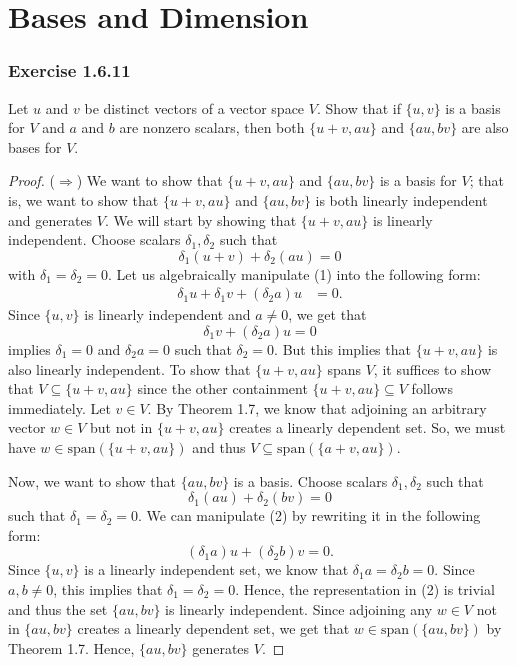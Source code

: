 \section{Bases and Dimension}

\subsubsection{Exercise 1.6.11} Let \( u  \) and \( v \) be distinct vectors of a vector space \( V  \). Show that if \( \{ u,v \}  \) is a basis for \( V  \) and \( a \) and \( b \) are nonzero scalars, then both \( \{ u + v , au  \}  \) and \( \{ au, bv \}  \) are also bases for \( V  \).

\begin{proof}
    (\( \Rightarrow \)) We want to show that \( \{ u+v , au \}  \) and \( \{ au, bv  \}  \) is a basis for \( V  \); that is, we want to show that \( \{ u +v , au  \}   \)  and \( \{ au, bv  \}  \) is both linearly independent and generates \( V  \). We will start by showing that \( \{ u+v , au \}  \) is linearly independent. Choose scalars \( \delta_{1}, \delta_{2}  \) such that 
    \[  \delta_{1} (u+v) + \delta_{2} (au) = 0 \tag{1}  \]
    with \( \delta_{1} =  \delta_{2} = 0  \). Let us algebraically manipulate (1) into the following form:
    \begin{align*} 
    \delta_{1} u + \delta_{1} v  + (\delta_{2}a) u &= 0.  
\end{align*}
Since \( \{ u,v  \}   \) is linearly independent and \( a \neq 0  \), we get that 
\[  \delta_{1} v + (\delta_{2}a) u = 0   \]
implies \( \delta_{1} = 0  \) and \( \delta_{2}a = 0  \) such that \( \delta_{2} = 0  \). But this implies that \( \{ u+v, au \}  \) is also linearly independent. To show that \( \{ u+v , au \}  \) spans \( V  \), it suffices to show that \( V \subseteq \{ u+v , au \}  \) since the other containment \( \{ u+ v , au  \} \subseteq V  \) follows immediately. Let \( v \in V  \). By Theorem 1.7, we know that adjoining an arbitrary vector \( w \in V  \) but not in \( \{ u+v , au \}  \) creates a linearly dependent set. So, we must have \( w \in \text{span}(\{ u+v , au \} ) \) and thus \( V \subseteq \text{span}(\{ a+v , au \} ) \). 

Now, we want to show that \( \{ au, bv  \}  \) is a basis. Choose scalars \( \delta_{1}, \delta_{2}  \) such that 
\[  \delta_{1} (au) + \delta_{2} (bv) = 0 \tag{2}   \]  
such that \( \delta_{1} = \delta_{2} = 0  \). We can manipulate (2) by rewriting it in the following form: 
\[  (\delta_{1}a) u + (\delta_{2}b) v = 0. \tag{3}  \]
Since \( \{ u,v  \}   \) is a linearly independent set, we know that   \( \delta_{1}a = \delta_{2}b = 0  \). Since \( a,b \neq 0 \), this implies that \( \delta_{1} = \delta_{2} = 0 \). Hence, the representation in (2) is trivial and thus the set \( \{ au, bv  \}  \) is linearly independent. Since adjoining any \( w \in V  \) not in \( \{ au, bv  \}  \) creates a linearly dependent set, we get that \( w \in \text{span}(\{ au,bv \} ) \) by Theorem 1.7. Hence, \( \{ au,bv \}  \) generates \( V  \). 


\end{proof}

